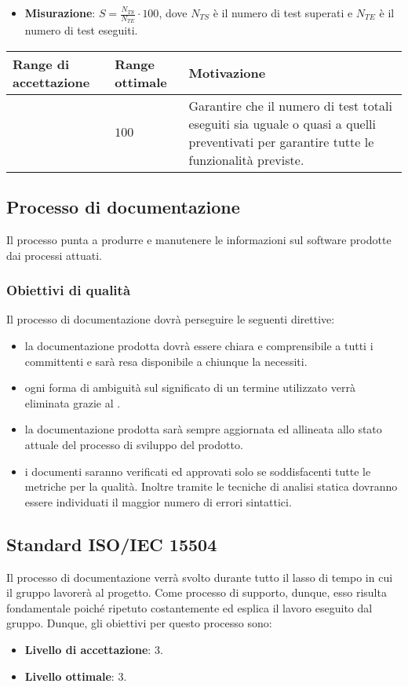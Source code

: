 \begin{itemize}
\item \textbf{Misurazione}: $S=\frac{N_{TS}}{N_{TE}} \cdot 100$, dove $N_{TS}$ è il numero di test superati e $N_{TE}$ è il numero di test eseguiti.
\end{itemize}

\begin{center}
		\begin{tabular}{|P{2.5cm}|P{2.5cm}|P{6cm}|}
		\hline
			\textbf{Range di accettazione}	& \textbf{Range ottimale} & \textbf{Motivazione} \\
			\hline
			[$90 - 100$] & $100$ &	Garantire che il numero di test totali eseguiti sia uguale o quasi a quelli preventivati per garantire tutte le funzionalità previste. \\
			\hline
			\end{tabular}
\end{center}



\subsection{Processo di documentazione}

Il processo punta a produrre e manutenere le informazioni sul software prodotte dai processi attuati.
\subsubsection{Obiettivi di qualità}
Il processo di documentazione dovrà perseguire le seguenti direttive:
\begin{itemize}
\item la documentazione prodotta dovrà essere chiara e comprensibile a tutti i committenti e sarà resa disponibile a chiunque la necessiti.
\item ogni forma di ambiguità sul significato di un termine utilizzato verrà eliminata grazie al \glossario.
\item la documentazione prodotta sarà sempre aggiornata ed allineata allo stato attuale del processo di sviluppo del prodotto.
\item i documenti saranno verificati ed approvati solo se soddisfacenti tutte le metriche per la qualità. Inoltre tramite le tecniche di analisi statica dovranno essere individuati il maggior numero di errori sintattici.
\end{itemize}

\subsection{Standard ISO/IEC 15504}
Il processo di documentazione verrà svolto durante tutto il lasso di tempo in cui il gruppo lavorerà al progetto. Come processo di supporto, dunque, esso risulta fondamentale poiché ripetuto costantemente ed esplica il lavoro eseguito dal gruppo. Dunque, gli obiettivi per questo processo sono:
\begin{itemize}
\item \textbf{Livello di accettazione}: 3.
\item \textbf{Livello ottimale}: 3.
\end{itemize}

